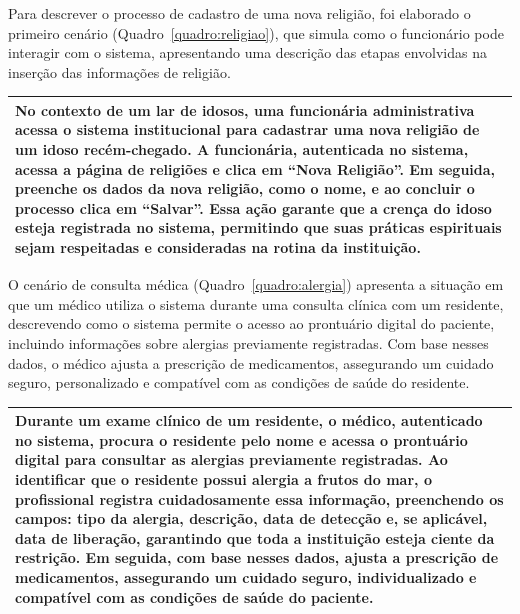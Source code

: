 Para descrever o processo de cadastro de uma nova religião, foi elaborado o primeiro cenário (Quadro~\ref{quadro:religiao}), que simula como o funcionário pode interagir com o sistema, apresentando uma descrição das etapas envolvidas na inserção das informações de religião.


\begin{quadro}[H]
	\caption[Cenário — Registro de Religião]{Cenário — Registro de Religião por um Funcionário do Lar dos Velhinhos}
	\label{quadro:religiao}
	\begin{tabularx}{\textwidth}{@{}X@{}}
		\toprule
		No contexto de um lar de idosos, uma funcionária administrativa acessa o sistema institucional para cadastrar uma nova religião de um idoso recém-chegado. A funcionária, autenticada no sistema, acessa a página de religiões e clica em ``Nova Religião''. Em seguida, preenche os dados da nova religião, como o nome, e ao concluir o processo clica em ``Salvar''. Essa ação garante que a crença do idoso esteja registrada no sistema, permitindo que suas práticas espirituais sejam respeitadas e consideradas na rotina da instituição.\\
		\bottomrule
	\end{tabularx}
\end{quadro}

O cenário de consulta médica (Quadro~\ref{quadro:alergia}) apresenta a situação em que um médico utiliza o sistema durante uma consulta clínica com um residente, descrevendo como o sistema permite o acesso ao prontuário digital do paciente, incluindo informações sobre alergias previamente registradas. Com base nesses dados, o médico ajusta a prescrição de medicamentos, assegurando um cuidado seguro, personalizado e compatível com as condições de saúde do residente.

\begin{quadro}[H]
	\caption[Cenário — Registro e Consulta de Alergias]
	{Cenário — Registro e Consulta de Alergias por Médico em Exame}
	\label{quadro:alergia}
	\begin{tabularx}{\textwidth}{@{}X@{}}
		\toprule
	Durante um exame clínico de um residente, o médico, autenticado no sistema, procura o residente pelo nome e acessa o prontuário digital para consultar as alergias previamente registradas. Ao identificar que o residente possui alergia a frutos do mar, o profissional registra cuidadosamente essa informação, preenchendo os campos: tipo da alergia, descrição, data de detecção e, se aplicável, data de liberação, garantindo que toda a instituição esteja ciente da restrição. Em seguida, com base nesses dados, ajusta a prescrição de medicamentos, assegurando um cuidado seguro, individualizado e compatível com as condições de saúde do paciente.\\
		\bottomrule
	\end{tabularx}
\end{quadro}



